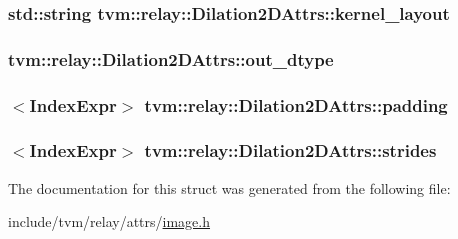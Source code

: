 \subsubsection[{\texorpdfstring{kernel\+\_\+layout}{kernel_layout}}]{\setlength{\rightskip}{0pt plus 5cm}std\+::string tvm\+::relay\+::\+Dilation2\+D\+Attrs\+::kernel\+\_\+layout}\hypertarget{structtvm_1_1relay_1_1Dilation2DAttrs_aecf84f5da8bfbe44e0c90c72ce3a4a53}{}\label{structtvm_1_1relay_1_1Dilation2DAttrs_aecf84f5da8bfbe44e0c90c72ce3a4a53}
\subsubsection[{\texorpdfstring{out\+\_\+dtype}{out_dtype}}]{ tvm\+::relay\+::\+Dilation2\+D\+Attrs\+::out\+\_\+dtype}\hypertarget{structtvm_1_1relay_1_1Dilation2DAttrs_aa65914cc64739d6b057a359375981745}{}\label{structtvm_1_1relay_1_1Dilation2DAttrs_aa65914cc64739d6b057a359375981745}
\subsubsection[{\texorpdfstring{padding}{padding}}]{$<${\bf Index\+Expr}$>$ tvm\+::relay\+::\+Dilation2\+D\+Attrs\+::padding}\hypertarget{structtvm_1_1relay_1_1Dilation2DAttrs_a775456a2b4d3f24b4c0b222b46fe5cf7}{}\label{structtvm_1_1relay_1_1Dilation2DAttrs_a775456a2b4d3f24b4c0b222b46fe5cf7}
\subsubsection[{\texorpdfstring{strides}{strides}}]{$<${\bf Index\+Expr}$>$ tvm\+::relay\+::\+Dilation2\+D\+Attrs\+::strides}\hypertarget{structtvm_1_1relay_1_1Dilation2DAttrs_a56303dd847fb1ac956343ae0ecb6a126}{}\label{structtvm_1_1relay_1_1Dilation2DAttrs_a56303dd847fb1ac956343ae0ecb6a126}


The documentation for this struct was generated from the following file\+:\begin{DoxyCompactItemize}
\item 
include/tvm/relay/attrs/\hyperlink{image_8h}{image.\+h}\end{DoxyCompactItemize}
